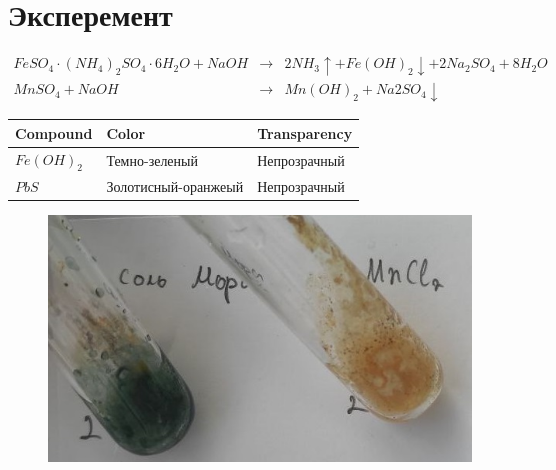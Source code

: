 \section{Эксперемент}
\begin{eqnarray} 
    FeSO_4 \cdot (NH_4)_2SO_4\cdot 6H_2O + 
    NaOH &\xrightarrow{}& 
    2NH_3 \uparrow + Fe(OH)_2 \downarrow + 
    2Na_2SO_4 + 8H_2O \\
    MnSO_4 + NaOH &\xrightarrow{}& 
    Mn(OH)_2 + Na2SO_4 \downarrow
\end{eqnarray} 

\begin{center}
    \begin{tabular}{l||l||l}
        Compound & Color & Transparency \\ \hline \hline
        $Fe(OH)_2$ & Темно-зеленый &    Непрозрачный \\
        $PbS$ & Золотисный-оранжеый &    Непрозрачный 
    \end{tabular}
\end{center}

\begin{figure}[h]
    \centering
    \includegraphics[width=1\linewidth]{Ex_2/1.jpg}
     \caption{}
    \label{ex_2_1}
\end{figure}


